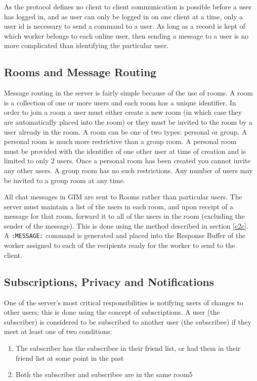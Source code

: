 As the protocol defines no client to client communication is possible before a user has logged in, and as user can only be logged in on one client at a time, only a user id is necessary to send a command to a user. As long as a record is kept of which worker belongs to each online user, then sending a message to a user is no more complicated than identifying the particular user.

\subsection{Rooms and Message Routing}
\label{message_routing}

Message routing in the server is fairly simple because of the use of rooms. A room is a collection of one or more users and each room has a unique identifier. In order to join a room a user must either create a new room (in which case they are automatically placed into the room) or they must be invited to the room by a user already in the room. A room can be one of two types: personal or group. A personal room is much more restrictive than a group room. A personal room must be provided with the identifier of one other user at time of creation and is limited to only 2 users. Once a personal room has been created you cannot invite any other users. A group room has no such restrictions. Any number of users may be invited to a group room at any time.

All chat messages in GIM are sent to Rooms rather than particular users. The server must maintain a list of the users in each room, and upon receipt of a message for that room, forward it to all of the users in the room (excluding the sender of the message). This is done using the method described in section \ref{c2c}. A \texttt{:MESSAGE:} command is generated and placed into the Response Buffer of the worker assigned to each of the recipients ready for the worker to send to the client.

\subsection{Subscriptions, Privacy and Notifications}
One of the server's most critical responsibilities is notifying users of changes to other users; this is done using the concept of subscriptions.  A user (the subscriber) is considered to be subscribed to another user (the subscribee) if they meet at least one of two conditions:

\begin{enumerate}
\item{The subscriber has the subscribee in their friend list, or had them in their friend list at some point in the past}
\item{Both the subscriber and subscribee are in the same room}5
\end{enumerate}

